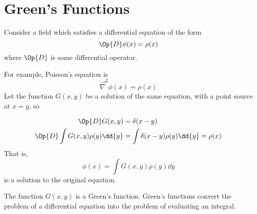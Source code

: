 \section{Green's Functions}
\label{sec:greens-functions}

Consider a field which satisfies a differential equation of the form
\begin{equation}
  \label{eq:14}
  \Op{D} \phi(x) = \rho(x)
\end{equation}
where $\Op{D}$ is some differential operator.

For example, Poisson's equation is
\[ \vec{\nabla}^2 \phi(x) = \rho(x) \] Let the function $G(x,y)$ be a
solution of the same equation, with a point source at $x=y$,  so

\begin{align*}
  \Op{D} G(x,y) &= \delta(x-y) \\
\Op{D} \int G(x,y) \rho(y) \dd{y} &= \int \delta(x-y) \rho(y) \dd{y} = \rho(x)
\end{align*}
That is,
\[ \phi(x) = \int G(x,y) \rho(y) \dd{y} \]
is a solution to the original equation.

The function $G(x,y)$ is a Green's function. Green's functions convert
the problem of a differential equation into the problem of evaluating
an integral.

